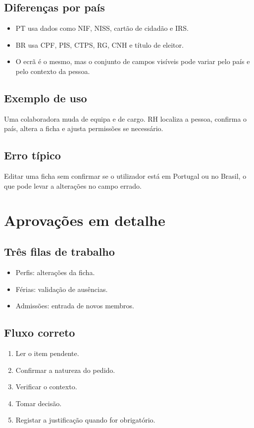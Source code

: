\subsection{Diferenças por país}
\begin{itemize}
  \item PT usa dados como NIF, NISS, cartão de cidadão e IRS.
  \item BR usa CPF, PIS, CTPS, RG, CNH e título de eleitor.
  \item O ecrã é o mesmo, mas o conjunto de campos visíveis pode variar pelo país e pelo contexto da pessoa.
\end{itemize}

\subsection{Exemplo de uso}
Uma colaboradora muda de equipa e de cargo. RH localiza a pessoa, confirma o país, altera a ficha e ajusta permissões se necessário.

\subsection{Erro típico}
Editar uma ficha sem confirmar se o utilizador está em Portugal ou no Brasil, o que pode levar a alterações no campo errado.

\section{Aprovações em detalhe}
\subsection{Três filas de trabalho}
\begin{itemize}
  \item Perfis: alterações da ficha.
  \item Férias: validação de ausências.
  \item Admissões: entrada de novos membros.
\end{itemize}

\subsection{Fluxo correto}
\begin{enumerate}
  \item Ler o item pendente.
  \item Confirmar a natureza do pedido.
  \item Verificar o contexto.
  \item Tomar decisão.
  \item Registar a justificação quando for obrigatório.
\end{enumerate}

